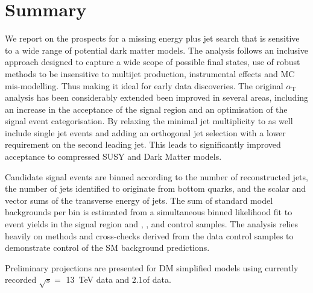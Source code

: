 \section{Summary}
\label{sec:summary}

We report on the prospects for a missing energy plus jet search that
is sensitive to a wide range of potential dark matter models.
The analysis follows an inclusive approach designed to capture a wide
scope of possible final states, use of robust methods to be
insensitive to multijet production, instrumental effects and MC
mis-modelling. Thus making it ideal for early data discoveries.
The original $\alpha_\textrm{T}$ analysis has been considerably extended  been improved in several areas, 
including an increase in the acceptance of the signal region and an optimisation of
the signal event categorisation. By relaxing the minimal jet multiplicity 
to as well include single jet events and adding an orthogonal jet selection with a lower 
\Pt requirement on the second leading jet. This leads to 
significantly improved acceptance to compressed SUSY and Dark Matter
models.

Candidate signal events are binned according to the number of
reconstructed jets, the number of jets identified to originate from
bottom quarks, and the scalar and vector sums of the transverse energy
of jets. The sum of standard model backgrounds per bin is estimated
from a simultaneous binned likelihood fit to event yields in the
signal region and \mj, \mmj, and \gj control samples. The
analysis relies heavily on methods and cross-checks derived from the
data control samples to demonstrate control of the SM background
predictions. 


Preliminary projections are presented for DM
simplified models using currently recorded $\sqrt{s} =$ 13~TeV data and $2.1$\ifb of data.

